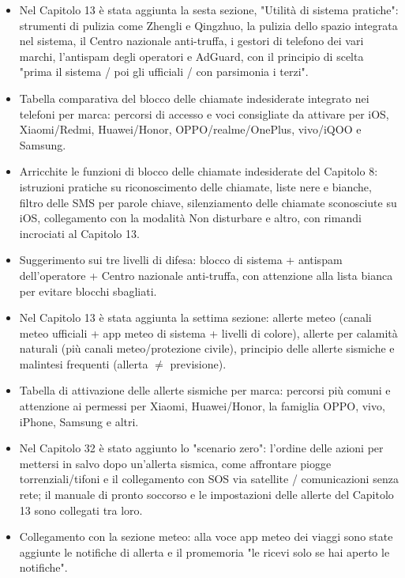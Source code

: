 
\begin{itemize}
  \item Nel Capitolo 13 è stata aggiunta la sesta sezione, "Utilità di sistema pratiche": strumenti di pulizia come Zhengli e Qingzhuo, la pulizia dello spazio integrata nel sistema, il Centro nazionale anti-truffa, i gestori di telefono dei vari marchi, l'antispam degli operatori e AdGuard, con il principio di scelta "prima il sistema / poi gli ufficiali / con parsimonia i terzi".
  \item Tabella comparativa del blocco delle chiamate indesiderate integrato nei telefoni per marca: percorsi di accesso e voci consigliate da attivare per iOS, Xiaomi/Redmi, Huawei/Honor, OPPO/realme/OnePlus, vivo/iQOO e Samsung.
  \item Arricchite le funzioni di blocco delle chiamate indesiderate del Capitolo 8: istruzioni pratiche su riconoscimento delle chiamate, liste nere e bianche, filtro delle SMS per parole chiave, silenziamento delle chiamate sconosciute su iOS, collegamento con la modalità Non disturbare e altro, con rimandi incrociati al Capitolo 13.
  \item Suggerimento sui tre livelli di difesa: blocco di sistema + antispam dell'operatore + Centro nazionale anti-truffa, con attenzione alla lista bianca per evitare blocchi sbagliati.
\end{itemize}


\begin{itemize}
  \item Nel Capitolo 13 è stata aggiunta la settima sezione: allerte meteo (canali meteo ufficiali + app meteo di sistema + livelli di colore), allerte per calamità naturali (più canali meteo/protezione civile), principio delle allerte sismiche e malintesi frequenti (allerta $\neq$ previsione).
  \item Tabella di attivazione delle allerte sismiche per marca: percorsi più comuni e attenzione ai permessi per Xiaomi, Huawei/Honor, la famiglia OPPO, vivo, iPhone, Samsung e altri.
  \item Nel Capitolo 32 è stato aggiunto lo "scenario zero": l'ordine delle azioni per mettersi in salvo dopo un'allerta sismica, come affrontare piogge torrenziali/tifoni e il collegamento con SOS via satellite / comunicazioni senza rete; il manuale di pronto soccorso e le impostazioni delle allerte del Capitolo 13 sono collegati tra loro.
  \item Collegamento con la sezione meteo: alla voce app meteo dei viaggi sono state aggiunte le notifiche di allerta e il promemoria "le ricevi solo se hai aperto le notifiche".
\end{itemize}

